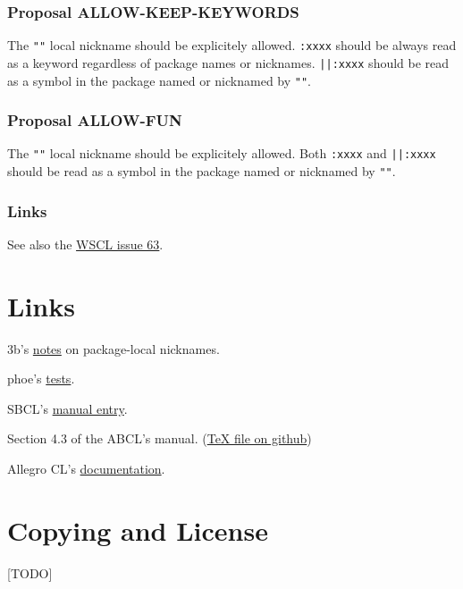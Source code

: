 \documentclass[11pt]{article}
\begin{document}
\subsubsection{Proposal ALLOW-KEEP-KEYWORDS}
\label{sec:orgab42497}
The \texttt{""} local nickname should be explicitely allowed. \texttt{:xxxx} should be always
read as a keyword regardless of package names or nicknames. \texttt{||:xxxx} should be
read as a symbol in the package named or nicknamed by \texttt{""}.
\subsubsection{Proposal ALLOW-FUN}
\label{sec:orgc63633e}
The \texttt{""} local nickname should be explicitely allowed. Both \texttt{:xxxx} and \texttt{||:xxxx}
should be read as a symbol in the package named or nicknamed by \texttt{""}.
\subsubsection{Links}
\label{sec:org09859b4}
See also the \href{https://github.com/s-expressionists/wscl/issues/63}{WSCL issue 63}.
\section{Links}
\label{sec:orgdab25c9}
3b's \href{https://github.com/3b/package-local-nicknames/blob/master/docs.org}{notes} on package-local nicknames.

phoe's \href{https://github.com/phoe/trivial-package-local-nicknames}{tests}.

SBCL's \href{https://www.sbcl.org/manual/\#Package\_002dLocal-Nicknames}{manual entry}.

Section 4.3 of the ABCL's manual. (\href{https://github.com/armedbear/abcl/blob/master/doc/manual/abcl.tex\#L1249}{\TeX{} file on github})

Allegro CL's \href{https://franz.com/support/documentation/11.0/packages.html\#local-nicknames-1}{documentation}.
\section{Copying and License}
\label{sec:org8ebe09c}
[TODO]
\end{document}
